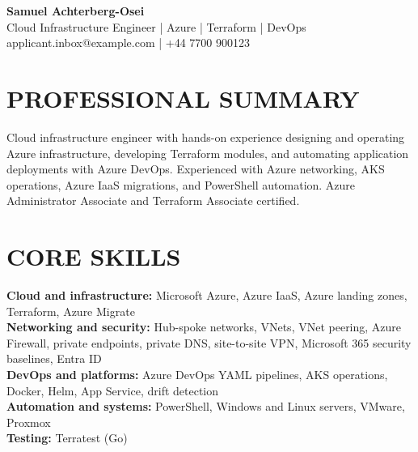 \documentclass[11pt,a4paper]{article}
\begin{document}
\begin{center}
{\Huge\bfseries\color{primarycolor} Samuel Achterberg-Osei}\\[0.3em]
{\large\color{accentcolor} Cloud Infrastructure Engineer | Azure | Terraform | DevOps}\\[0.3em]
applicant.inbox@example.com | +44 7700 900123
\end{center}
\vspace{0.3em}

\section*{PROFESSIONAL SUMMARY}
Cloud infrastructure engineer with hands-on experience designing and operating Azure infrastructure, developing Terraform modules, and automating application deployments with Azure DevOps. Experienced with Azure networking, AKS operations, Azure IaaS migrations, and PowerShell automation. Azure Administrator Associate and Terraform Associate certified.

\section*{CORE SKILLS}
\textbf{Cloud and infrastructure:} Microsoft Azure, Azure IaaS, Azure landing zones, Terraform, Azure Migrate\\
\textbf{Networking and security:} Hub-spoke networks, VNets, VNet peering, Azure Firewall, private endpoints, private DNS, site-to-site VPN, Microsoft 365 security baselines, Entra ID\\
\textbf{DevOps and platforms:} Azure DevOps YAML pipelines, AKS operations, Docker, Helm, App Service, drift detection\\
\textbf{Automation and systems:} PowerShell, Windows and Linux servers, VMware, Proxmox\\
\textbf{Testing:} Terratest (Go)
\end{document}
